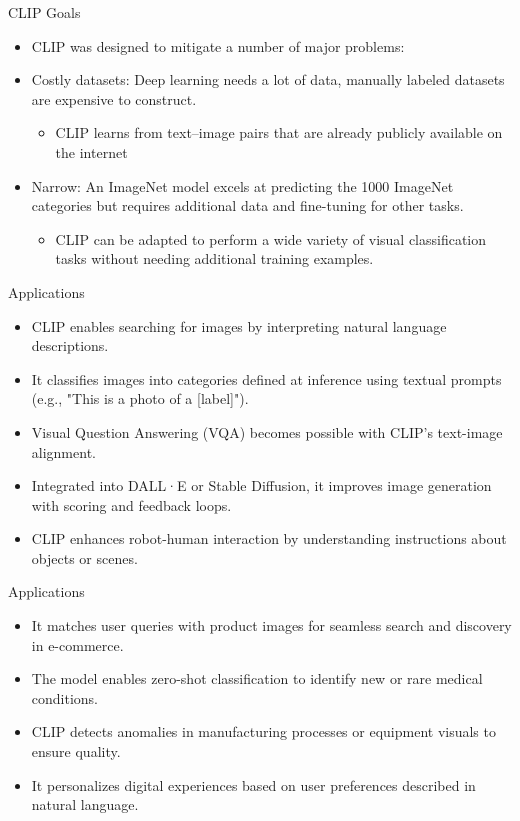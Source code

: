 \documentclass[serif, aspectratio=169]{beamer}
\begin{document}
\begin{frame}{CLIP Goals}
\begin{itemize}
\item CLIP was designed to mitigate a number of major problems:
\item Costly datasets: Deep learning needs a lot of data, manually labeled datasets are expensive to construct.
\begin{itemize}
\item CLIP learns from text–image pairs that are already publicly available on the internet
\end{itemize}
\item Narrow: An ImageNet model excels at predicting the 1000 ImageNet categories but requires additional data and fine-tuning for other tasks. 

\begin{itemize}
\item CLIP can be adapted to perform a wide variety of visual classification tasks without needing additional training examples. 
\end{itemize}
\end{itemize}

\end{frame}


\begin{frame}{Applications}
    \begin{itemize}
        \item CLIP enables searching for images by interpreting natural language descriptions.
        \item It classifies images into categories defined at inference using textual prompts (e.g., "This is a photo of a [label]").
        \item Visual Question Answering (VQA) becomes possible with CLIP’s text-image alignment.
        \item Integrated into DALL·E or Stable Diffusion, it improves image generation with scoring and feedback loops.
        \item CLIP enhances robot-human interaction by understanding instructions about objects or scenes.
    \end{itemize}
\end{frame}


\begin{frame}{Applications}
    \begin{itemize}
        \item It matches user queries with product images for seamless search and discovery in e-commerce.
       \item The model enables zero-shot classification to identify new or rare medical conditions.
        \item CLIP detects anomalies in manufacturing processes or equipment visuals to ensure quality.
        \item It personalizes digital experiences based on user preferences described in natural language.
    \end{itemize}
\end{frame}
\end{document}

